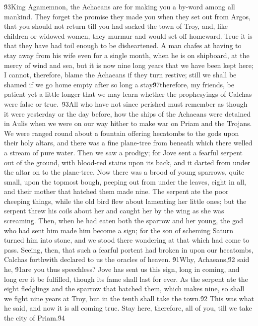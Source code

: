 {\'93King Agamemnon, the Achaeans are for making you a by-word among all mankind. They forget the promise they made you when they set out from Argos, that you should not return till you had sacked the town of Troy, and, like children or widowed women, they murmur and would set off homeward. True it is that they have had toil enough to be disheartened. A man chafes at having to stay away from his wife even for a single month, when he is on shipboard, at the mercy of wind and sea, but it is now nine long years that we have been kept here; I cannot, therefore, blame the Achaeans if they turn restive; still we shall be shamed if we go home empty after so long a stay\'97therefore, my friends, be patient yet a little longer that we may learn whether the prophesyings of Calchas were false or true.\
\'93All who have not since perished must remember as though it were yesterday or the day before, how the ships of the Achaeans were detained in Aulis when we were on our way hither to make war on Priam and the Trojans. We were ranged round about a fountain offering hecatombs to the gods upon their holy altars, and there was a fine plane-tree from beneath which there welled a stream of pure water. Then we saw a prodigy; for Jove sent a fearful serpent out of the ground, with blood-red stains upon its back, and it darted from under the altar on to the plane-tree. Now there was a brood of young sparrows, quite small, upon the topmost bough, peeping out from under the leaves, eight in all, and their mother that hatched them made nine. The serpent ate the poor cheeping things, while the old bird flew about lamenting her little ones; but the serpent threw his coils about her and caught her by the wing as she was screaming. Then, when he had eaten both the sparrow and her young, the god who had sent him made him become a sign; for the son of scheming Saturn turned him into stone, and we stood there wondering at that which had come to pass. Seeing, then, that such a fearful portent had broken in upon our hecatombs, Calchas forthwith declared to us the oracles of heaven. \'91Why, Achaeans,\'92 said he, \'91are you thus speechless? Jove has sent us this sign, long in coming, and long ere it be fulfilled, though its fame shall last for ever. As the serpent ate the eight fledglings and the sparrow that hatched them, which makes nine, so shall we fight nine years at Troy, but in the tenth shall take the town.\'92 This was what he said, and now it is all coming true. Stay here, therefore, all of you, till we take the city of Priam.\'94\
}
